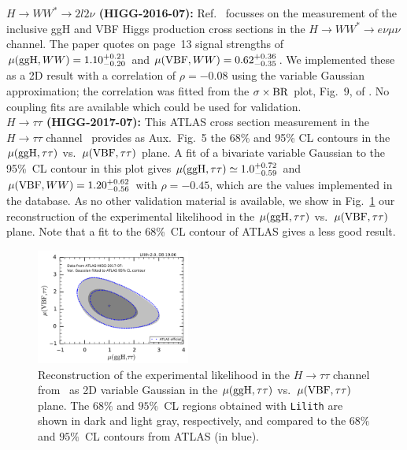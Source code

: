 
{\bf\boldmath $H\to WW^*\to 2l2\nu$ (HIGG-2016-07):} Ref.~\cite{Aaboud:2018jqu} focusses on the measurement of the 
inclusive ggH and VBF Higgs production cross sections in the $H\to WW^*\to e\nu\mu\nu$ channel. The paper quotes 
on page~13 signal strengths of $\mu({\rm ggH}, WW)=1.10^{+0.21}_{-0.20}$ and $\mu({\rm VBF}, WW)=0.62^{+0.36}_{-0.35}$. 
We implemented these as a 2D result with a correlation of $\rho=-0.08$ using the variable Gaussian approximation; 
the correlation was fitted from the $\sigma\times{\rm BR}$ plot, Fig.~9, of \cite{Aaboud:2018jqu}. 
No coupling fits are available which could be used for validation. \\


{\bf\boldmath $H\to \tau\tau$ (HIGG-2017-07):} This ATLAS cross section measurement in the $H\to \tau\tau$ channel~\cite{Aaboud:2018pen} 
provides as Aux.~Fig.~5 the 68\% and 95\% CL contours in the $\mu({\rm ggH}, \tau\tau)$ vs.\ $\mu({\rm VBF}, \tau\tau)$ plane. 
A fit of a bivariate variable Gaussian to the 95\%~CL contour in this plot  
gives $\mu({\rm ggH}, \tau\tau)\simeq 1.0^{+0.72}_{-0.59}$ and $\mu({\rm VBF}, WW)=1.20^{+0.62}_{-0.56}$ with 
$\rho = -0.45$, which are the values implemented in the database. As no other validation material is available, 
we show in Fig.~\ref{fig:validation_atlas_tautau} our reconstruction of the experimental likelihood in the 
$\mu({\rm ggH}, \tau\tau)$ vs.\ $\mu({\rm VBF}, \tau\tau)$ plane. 
Note that a fit to the 68\%~CL contour of ATLAS gives a less good result. \\

\begin{figure}[h!]\centering
\includegraphics[width=0.45\textwidth]{validation/ATLAS/HIGG-2017-07-mu-2d.pdf}
\caption{Reconstruction of the experimental likelihood in the $H\to \tau\tau$ channel from~\cite{Aaboud:2018pen} 
as 2D variable Gaussian in the $\mu({\rm ggH}, \tau\tau)$ vs.\ $\mu({\rm VBF}, \tau\tau)$ plane. 
The  $68\%$ and $95\%$~CL regions obtained with {\tt Lilith} are shown in dark and light gray, respectively, 
and compared to the $68\%$ and  $95\%$~CL contours from ATLAS (in blue).}
\label{fig:validation_atlas_tautau}
\end{figure}

